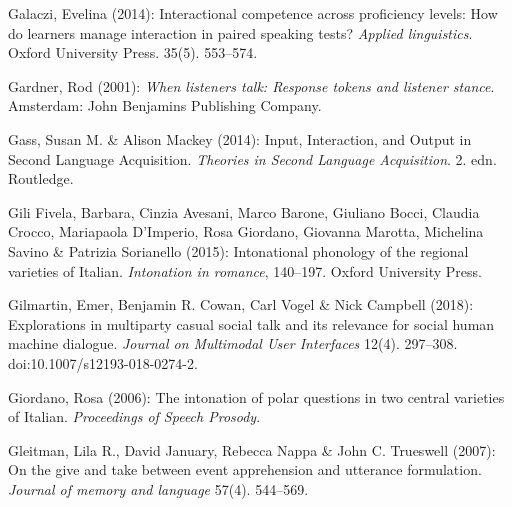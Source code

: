 \begin{styleBibliography}
Galaczi, Evelina (2014): Interactional competence across proficiency levels: How do learners manage interaction in paired speaking tests? \textit{Applied linguistics}. Oxford University Press. 35(5). 553–574.
\end{styleBibliography}

\begin{styleBibliography}
Gardner, Rod (2001): \textit{When listeners talk: Response tokens and listener stance}. Amsterdam: John Benjamins Publishing Company.
\end{styleBibliography}

\begin{styleBibliography}
Gass, Susan M. \& Alison Mackey (2014): Input, Interaction, and Output in Second Language Acquisition. \textit{Theories in Second Language Acquisition}. 2. edn. Routledge.
\end{styleBibliography}

\begin{styleBibliography}
Gili Fivela, Barbara, Cinzia Avesani, Marco Barone, Giuliano Bocci, Claudia Crocco, Mariapaola D’Imperio, Rosa Giordano, Giovanna Marotta, Michelina Savino \& Patrizia Sorianello (2015): Intonational phonology of the regional varieties of Italian. \textit{Intonation in romance}, 140–197. Oxford University Press.
\end{styleBibliography}

\begin{styleBibliography}
Gilmartin, Emer, Benjamin R. Cowan, Carl Vogel \& Nick Campbell (2018): Explorations in multiparty casual social talk and its relevance for social human machine dialogue. \textit{Journal on Multimodal User Interfaces} 12(4). 297–308. doi:10.1007/s12193-018-0274-2.
\end{styleBibliography}

\begin{styleBibliography}
Giordano, Rosa (2006): The intonation of polar questions in two central varieties of Italian. \textit{Proceedings of Speech Prosody}.
\end{styleBibliography}

\begin{styleBibliography}
Gleitman, Lila R., David January, Rebecca Nappa \& John C. Trueswell (2007): On the give and take between event apprehension and utterance formulation. \textit{Journal of memory and language} 57(4). 544–569.
\end{styleBibliography}

